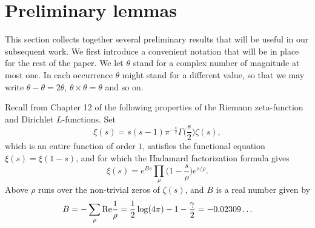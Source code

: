 \documentclass [12pt]{amsart}
\newtheorem{rmk}{Remark}[section]
\numberwithin{equation}{section}
\newcommand{\tRe}{\textup{Re}}
\begin{document}

\section{Preliminary lemmas}

\noindent This section collects together several preliminary results that will be useful in 
our subsequent work.   We first introduce a convenient notation that will be in place 
for the rest of the paper.  We let $\theta$ stand for a complex number of magnitude at 
most one.  In each occurrence $\theta$ might stand for a different value, so that we may write 
$\theta -\theta =2\theta$, $\theta \times \theta =\theta$ and so on. 

Recall from Chapter 12 of \cite{Da} the following properties of the Riemann zeta-function and 
Dirichlet $L$-functions.   Set
$$
\xi(s) = s(s-1) \pi^{-\frac s2} \Gamma\Big(\frac s2\Big) \zeta(s),
$$
which is an entire function of order $1$, satisfies the functional equation $\xi(s) = \xi(1-s)$, 
and for which the
Hadamard factorization formula gives
\begin{equation}
\label{Had3}
\xi(s) = e^{Bs} \prod_{\rho} \Big(1-\frac s\rho\Big) e^{s/\rho}.
\end{equation}
Above $\rho$ runs over the non-trivial zeros of $\zeta(s)$, and $B$ is a
real number given by
\begin{equation}
\label{Had4}
B= -\sum_{\rho} \tRe \frac{1}{\rho}  =  \frac 12\log (4\pi) - 1 -\frac{\gamma}{2}
= - 0.02309\ldots
\end{equation}
 
\end{document}
